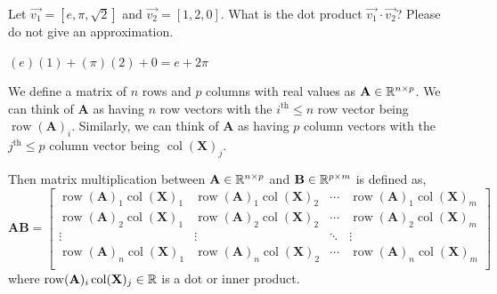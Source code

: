\documentclass{homework}
\DeclareMathOperator{\row}{row}
\DeclareMathOperator{\col}{col}
\begin{document}
\question Let $\vec{v_1} = [e, \pi, \sqrt{2}]$ and $\vec{v_2} = [1, 2, 0]$.
What is the dot product $\vec{v_1} \cdot \vec{v_2}$? Please do not
give an approximation.

\begin{sol}
  $(e)(1) + (\pi)(2) + 0 = e + 2\pi$
\end{sol}

\question We define a matrix of $n$ rows and $p$ columns with real values as
$\mathbf{A} \in \mathbb{R}^{n\times p}$. We can think of $\mathbf{A}$ as
having $n$ row vectors with the $i^\text{th} \leq n$ row vector
being $\row(\mathbf{A})_i$. Similarly, we can think of
$\mathbf{A}$ as having $p$ column vectors with the $j^\text{th}
  \leq p$ column vector being $\col(\mathbf{X})_j$.

Then matrix multiplication between $\mathbf{A} \in \mathbb{R}^{n\times p}$
and $\mathbf{B} \in \mathbb{R}^{p\times m}$ is defined as,
\[
  \mathbf{AB} =
  \begin{bmatrix}
    \row(\mathbf{A})_1\col(\mathbf{X})_1 & \row(\mathbf{A})_1\col(\mathbf{X})_2 & \cdots & \row(\mathbf{A})_1\col(\mathbf{X})_m \\
    \row(\mathbf{A})_2\col(\mathbf{X})_1 & \row(\mathbf{A})_2\col(\mathbf{X})_2 & \cdots & \row(\mathbf{A})_2\col(\mathbf{X})_m \\
    \vdots                               & \vdots                               & \ddots & \vdots                               \\
    \row(\mathbf{A})_n\col(\mathbf{X})_1 & \row(\mathbf{A})_n\col(\mathbf{X})_2 & \cdots & \row(\mathbf{A})_n\col(\mathbf{X})_m \\
  \end{bmatrix}
\]
where $\row(\mathbf{A})_i\col(\mathbf{X})_j \in \R$ is a dot or
inner product.
\end{document}
